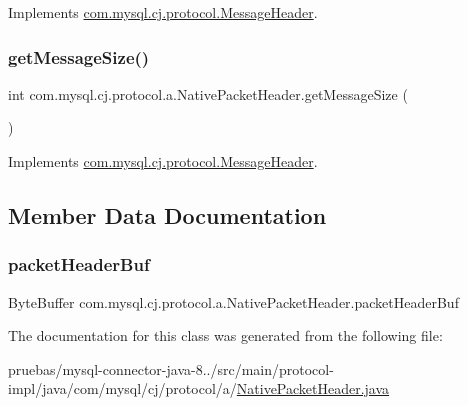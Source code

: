 Implements \mbox{\hyperlink{interfacecom_1_1mysql_1_1cj_1_1protocol_1_1_message_header_addc9db095cb10062d2a3b0e3ad180750}{com.\+mysql.\+cj.\+protocol.\+Message\+Header}}.

\mbox{\label{classcom_1_1mysql_1_1cj_1_1protocol_1_1a_1_1_native_packet_header_a334336fd736a087bae40bfbb288e27e4}} 
\subsubsection{\texorpdfstring{get\+Message\+Size()}{getMessageSize()}}
{\footnotesize\ttfamily int com.\+mysql.\+cj.\+protocol.\+a.\+Native\+Packet\+Header.\+get\+Message\+Size (\begin{DoxyParamCaption}{ }\end{DoxyParamCaption})}



Implements \mbox{\hyperlink{interfacecom_1_1mysql_1_1cj_1_1protocol_1_1_message_header_a8192e2c73dd6c3ed31e569034950f163}{com.\+mysql.\+cj.\+protocol.\+Message\+Header}}.



\subsection{Member Data Documentation}
\mbox{\label{classcom_1_1mysql_1_1cj_1_1protocol_1_1a_1_1_native_packet_header_acc38ab1e40bb3c988932ceb4165b114c}} 
\subsubsection{\texorpdfstring{packet\+Header\+Buf}{packetHeaderBuf}}
{\footnotesize\ttfamily Byte\+Buffer com.\+mysql.\+cj.\+protocol.\+a.\+Native\+Packet\+Header.\+packet\+Header\+Buf\hspace{0.3cm}{\ttfamily [protected]}}



The documentation for this class was generated from the following file\+:\begin{DoxyCompactItemize}
\item 
pruebas/mysql-\/connector-\/java-\/8../src/main/protocol-\/impl/java/com/mysql/cj/protocol/a/\mbox{\hyperlink{_native_packet_header_8java}{Native\+Packet\+Header.\+java}}\end{DoxyCompactItemize}
